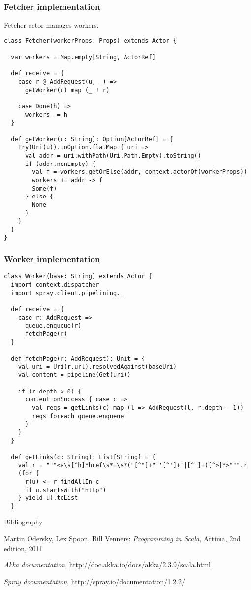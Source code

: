 \begin{frame}[fragile]
\frametitle{Fetcher implementation}
Fetcher actor manages workers.
\begin{lstlisting}
class Fetcher(workerProps: Props) extends Actor {

  var workers = Map.empty[String, ActorRef]

  def receive = {
    case r @ AddRequest(u, _) =>
      getWorker(u) map (_ ! r)

    case Done(h) =>
      workers -= h
  }

  def getWorker(u: String): Option[ActorRef] = {
    Try(Uri(u)).toOption.flatMap { uri =>
      val addr = uri.withPath(Uri.Path.Empty).toString()
      if (addr.nonEmpty) {
        val f = workers.getOrElse(addr, context.actorOf(workerProps))
        workers += addr -> f
        Some(f)
      } else {
        None
      }
    }
  }
}
\end{lstlisting}
\end{frame}

\begin{frame}[fragile]
\frametitle{Worker implementation}
\begin{lstlisting}
class Worker(base: String) extends Actor {
  import context.dispatcher
  import spray.client.pipelining._

  def receive = {
    case r: AddRequest =>
      queue.enqueue(r)
      fetchPage(r)
  }

  def fetchPage(r: AddRequest): Unit = {
    val uri = Uri(r.url).resolvedAgainst(baseUri)
    val content = pipeline(Get(uri))

    if (r.depth > 0) {
      content onSuccess { case c =>
        val reqs = getLinks(c) map (l => AddRequest(l, r.depth - 1))
        reqs foreach queue.enqueue
      }
    }
  }

  def getLinks(c: String): List[String] = {
    val r = """<a\s[^h]*href\s*=\s*("[^"]+"|'[^']+'|[^ ]+)[^>]*>""".r
    (for {
      r(u) <- r findAllIn c
      if u.startsWith("http")
    } yield u).toList
  }
\end{lstlisting}
\end{frame}

\begin{frame}{Bibliography}
\begin{thebibliography}{00}
Martin Odersky, Lex Spoon, Bill Venners:
\emph{Programming in Scala},
Artima, 2nd edition, 2011

\emph{Akka documentation}, \url{http://doc.akka.io/docs/akka/2.3.9/scala.html}

\emph{Spray documentation}, \url{http://spray.io/documentation/1.2.2/}
\end{thebibliography}
\end{frame}




